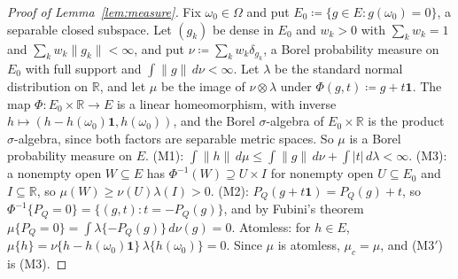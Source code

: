 \documentclass[11pt]{article}
\newcommand{\R}{\mathbb{R}}
\newcommand{\one}{\mathbf{1}}
\theoremstyle{plain}
\theoremstyle{definition}
\theoremstyle{remark}
\begin{document}
\begin{proof}[Proof of Lemma~\ref{lem:measure}]
Fix $\omega_0\in\Omega$ and put $E_0\coloneqq\{g\in E:g(\omega_0)=0\}$, a separable closed
subspace. Let $(g_k)$ be dense in $E_0$ and $w_k>0$ with $\sum_kw_k=1$ and $\sum_kw_k\|g_k\|<
\infty$, and put $\nu\coloneqq\sum_kw_k\delta_{g_k}$, a Borel probability measure on $E_0$ with
full support and $\int\|g\|\,d\nu<\infty$. Let $\lambda$ be the standard normal distribution on
$\R$, and let $\mu$ be the image of $\nu\otimes\lambda$ under $\Phi(g,t)\coloneqq g+t\one$. The
map $\Phi:E_0\times\R\to E$ is a linear homeomorphism, with inverse $h\mapsto(h-h(\omega_0)
\one,h(\omega_0))$, and the Borel $\sigma$-algebra of $E_0\times\R$ is the product
$\sigma$-algebra, since both factors are separable metric spaces. So $\mu$ is a Borel
probability measure on $E$.
(M1): $\int\|h\|\,d\mu\le\int\|g\|\,d\nu+\int|t|\,d\lambda<\infty$.
(M3): a nonempty open $W\subseteq E$ has $\Phi^{-1}(W)\supseteq U\times I$ for nonempty open
$U\subseteq E_0$ and $I\subseteq\R$, so $\mu(W)\ge\nu(U)\lambda(I)>0$.
(M2): $P_Q(g+t\one)=P_Q(g)+t$, so $\Phi^{-1}\{P_Q=0\}=\{(g,t):t=-P_Q(g)\}$, and by Fubini's
theorem $\mu\{P_Q=0\}=\int\lambda\{-P_Q(g)\}\,d\nu(g)=0$.
Atomless: for $h\in E$, $\mu\{h\}=\nu\{h-h(\omega_0)\one\}\,\lambda\{h(\omega_0)\}=0$.
Since $\mu$ is atomless, $\mu_c=\mu$, and (M3$'$) is (M3).
\end{proof}
\end{document}
